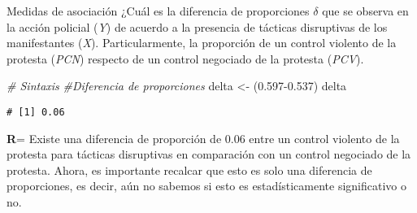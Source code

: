 \documentclass[
  8pt,
  ignorenonframetext,
]{beamer}
\newenvironment{Shaded}{\begin{snugshade}}{\end{snugshade}}
\newcommand{\CommentTok}[1]{\textcolor[rgb]{0.56,0.35,0.01}{\textit{#1}}}
\newcommand{\FloatTok}[1]{\textcolor[rgb]{0.00,0.00,0.81}{#1}}
\newcommand{\NormalTok}[1]{#1}
\newcommand{\OtherTok}[1]{\textcolor[rgb]{0.56,0.35,0.01}{#1}}
\begin{document}
\begin{frame}[fragile]{Medidas de asociación}
\protect\hypertarget{medidas-de-asociaciuxf3n-5}{}
¿Cuál es la diferencia de proporciones \(\delta\) que se observa en la
acción policial (\emph{Y}) de acuerdo a la presencia de tácticas
disruptivas de los manifestantes (\emph{X}). Particularmente, la
proporción de un control violento de la protesta (\emph{PCN}) respecto
de un control negociado de la protesta (\emph{PCV}).

\begin{Shaded}
\begin{Highlighting}[]
\CommentTok{\# Sintaxis}
\CommentTok{\#Diferencia de proporciones}
\NormalTok{delta }\OtherTok{\textless{}{-}}\NormalTok{ (}\FloatTok{0.597{-}0.537}\NormalTok{)}
\NormalTok{delta}
\end{Highlighting}
\end{Shaded}

\begin{verbatim}
# [1] 0.06
\end{verbatim}

\textbf{R}= Existe una diferencia de proporción de 0.06 entre un control
violento de la protesta para tácticas disruptivas en comparación con un
control negociado de la protesta. Ahora, es importante recalcar que esto
es solo una diferencia de proporciones, es decir, aún no sabemos si esto
es estadísticamente significativo o no.
\end{frame}
\end{document}
